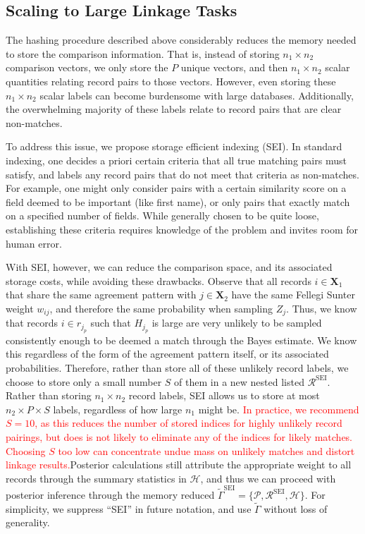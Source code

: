 \documentclass[ba]{imsart}
\begin{document}
\hypertarget{scaling}{%
	\subsection{Scaling to Large Linkage Tasks}\label{scaling}}

The hashing procedure described above considerably reduces the memory needed to store the comparison information. That is, instead of storing \(n_1 \times n_2\) comparison vectors, we only store the \(P\) unique vectors, and then \(n_1 \times n_2\) scalar quantities relating record pairs to those vectors. However, even storing these \(n_1 \times n_2\) scalar labels can become burdensome with large databases. Additionally, the overwhelming majority of these labels relate to record pairs that are clear non-matches.

To address this issue, we propose storage efficient indexing (SEI). In standard indexing, one decides a priori certain criteria that all true matching pairs must satisfy, and labels any record pairs that do not meet that criteria as non-matches. For example, one might only consider pairs with a certain similarity score on a field deemed to be important (like first name), or only pairs that exactly match on a specified number of fields. While generally chosen to be quite loose, establishing these criteria requires knowledge of the problem and invites room for human error. 

With SEI, however, we can reduce the comparison space, and its associated storage costs, while avoiding these drawbacks. Observe that all records $i \in \bm{X}_1$ that share the same agreement pattern with $j \in \bm{X}_2$ have the same Fellegi Sunter weight $w_{ij}$, and therefore the same probability when sampling \(Z_j\). Thus, we know that records $i \in r_{j_p}$  such that $H_{j_p}$ is large are very unlikely to be sampled consistently enough to be deemed a match through the Bayes estimate. We know this regardless of the form of the agreement pattern itself, or its associated probabilities. Therefore, rather than store all of these unlikely record labels, we choose to store only a small number \(S\) of them in a new nested listed $\mathcal{R}^{\text{SEI}}$. Rather than storing \(n_1 \times n_2\) record labels, SEI allows us to store at most
\(n_2 \times P \times S\) labels, regardless of how large \(n_1\) might be. \textcolor{red}{In practice, we recommend $S=10$, as this reduces the number of stored indices for highly unlikely record pairings, but does is not likely to eliminate any of the indices for likely matches. Choosing $S$ too low can concentrate undue mass on unlikely matches and distort linkage results.}Posterior calculations still attribute the appropriate weight to all records through the summary statistics in $\mathcal{H}$, and thus we can proceed with posterior inference through the memory reduced $\tilde{\Gamma}^{\text{SEI}} = \{\mathcal{P}, \mathcal{R}^{\text{SEI}}, \mathcal{H}\}$. For simplicity, we suppress ``SEI'' in future notation, and use $\tilde{\Gamma}$ without loss of generality. 
\end{document}
